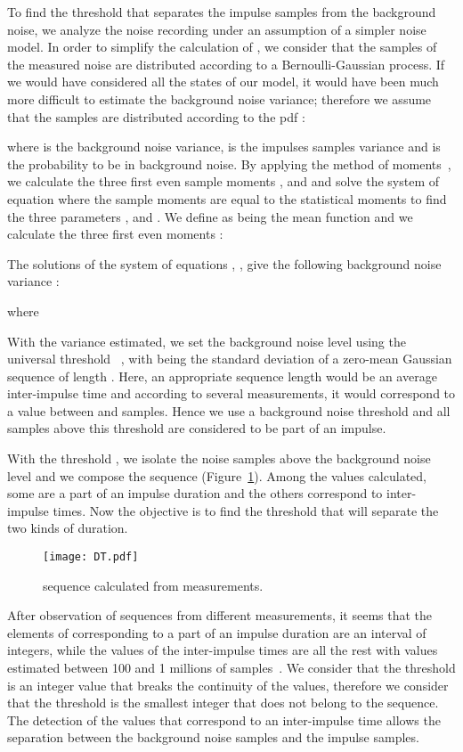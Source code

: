 \documentclass[journal]{IEEEtran}
\begin{document}
To find the threshold  that separates the impulse samples from the background noise, we analyze the noise recording under an assumption of a simpler noise model. In order to simplify the calculation of , we consider that the samples of the measured noise are distributed according to a Bernoulli-Gaussian process. If we would have considered all the states of our model, it would have been much more difficult to estimate the background noise variance; therefore we assume that the samples are distributed according to the pdf :

where  is the background noise variance,  is the impulses samples variance and  is the probability to be in background noise.
By applying the method of moments~\cite{zabin1}, we calculate the three first even sample moments ,  and  and solve the system of equation where the sample moments are equal to the statistical moments to find the three parameters ,  and . We define  as being the mean function and we calculate the three first even moments :
      
The solutions of the system of equations , , give the following background noise variance  :


where
      
With the variance estimated, we set the background noise level using the universal threshold~\cite{univ} , with  being the standard deviation of a zero-mean Gaussian sequence of length . Here, an appropriate sequence length  would be an average inter-impulse time and according to several measurements, it would correspond to a value between  and  samples. Hence we use a background noise threshold  and all samples above this threshold are considered to be part of an impulse.\

With the threshold , we isolate the noise samples above the background noise level and we compose the sequence  (Figure~\ref{DT}). Among the values calculated, some are a part of an impulse duration and the others correspond to inter-impulse times. Now the objective is to find the threshold  that will separate the two kinds of duration.
\begin{figure}[h]
\begin{center}
  \texttt{[image: DT.pdf]}\\
\end{center}
  \caption{ sequence calculated from measurements.}\label{DT}
\end{figure}
After observation of  sequences from different measurements, it seems that the elements of  corresponding to a part of an impulse duration are an interval of integers, while the values of the inter-impulse times are all the rest with values estimated between 100 and 1 millions of samples~\cite{cigre}. We consider that the threshold  is an integer value that breaks the continuity of the  values, therefore we consider that the threshold  is the smallest integer that does not belong to the  sequence. The detection of the  values that correspond to an inter-impulse time allows the separation between the background noise samples and the impulse samples.\
\end{document}
